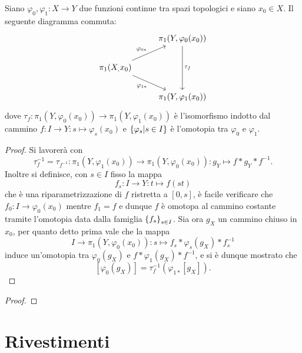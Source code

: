 \documentclass[]{article}
\begin{document}
\begin{lemma} \nl
    Siano $\varphi_0, \varphi_1: X \to Y$ due funzioni continue tra spazi topologici e siano $x_0 \in X$. \nl
    Il seguente diagramma commuta:
    \[
        \begin{tikzcd}
        & {\pi_1(Y,\varphi_0(x_0))} \\
        {\pi_1(X_,x_0)} \\
        & {\pi_1(Y,\varphi_1(x_0))}
        \arrow["{\tau_f}", from=1-2, to=3-2]
        \arrow["{\varphi_{0*}}", from=2-1, to=1-2]
        \arrow["{\varphi_{1*}}"', from=2-1, to=3-2]
        \end{tikzcd}
    \]
    dove $\tau_f: \pi_1(Y, \varphi_0(x_0)) \to \pi_1(Y, \varphi_1(x_0))$ è l'isomorfismo indotto dal cammino
    $f: I \to Y: s \mapsto \varphi_s(x_0)$ e $\left\{ \varphi_s | s \in I \right\}$ \`e l'omotopia tra $\varphi_0$ e $\varphi_1$.
\end{lemma}

\begin{proof} \nl
    Si lavorer\`a con 
    \[
        \tau^{-1}_f = \tau_{f^{-1}}: \pi_1(Y, \varphi_1(x_0)) \to \pi_1(Y, \varphi_0(x_0)): g_Y \mapsto f*g_Y*f^{-1}.
    \]
    Inoltre si definisce, con $s \in I$ fisso la mappa
    \[
        f_s: I \to Y: t \mapsto f(st)
    \]
    che \`e una riparametrizzazione di $f$ ristretta a $[0,s]$, \`e facile verificare che 
    $f_0: I \to {\varphi_0(x_0)}$ mentre $f_1 = f$ e dunque $f$ \`e omotopa al cammino costante tramite
    l'omotopia data dalla famiglia $\left\{ f_s \right\}_{s \in I}$. \nl
    Sia ora $g_X$ un cammino chiuso in ${x_0}$, per quanto detto prima vale che la mappa
    \[
        I \to \pi_1(Y, \varphi_0(x_0)): s \mapsto f_s * \varphi_s(g_X) * f_s^{-1}
    \]
    induce un'omotopia tra $\varphi_0(g_X)$ e $f*\varphi_1(g_X)*f^{-1}$, e si \`e dunque mostrato che
    \[
        \left[ \varphi_0(g_X)\right] = \tau_f^{-1}(\varphi_{1*}\left[g_X\right]).
    \]
\end{proof}

\begin{proof}
\end{proof} 

\section{Rivestimenti}
\end{document}
